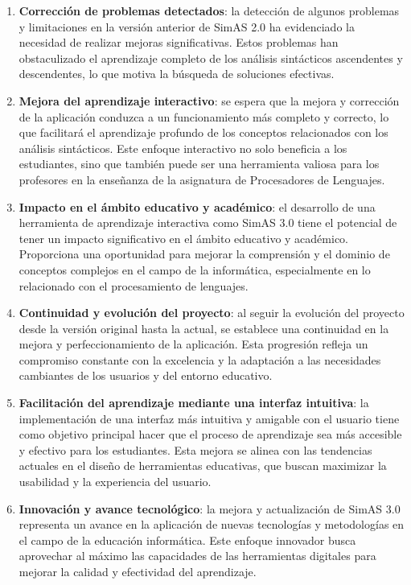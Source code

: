 \begin{enumerate}
    \item \textbf{Corrección de problemas detectados}: la detección de algunos problemas y limitaciones en la versión anterior de SimAS 2.0 ha evidenciado la necesidad de realizar mejoras significativas. Estos problemas han obstaculizado el aprendizaje completo de los análisis sintácticos ascendentes y descendentes, lo que motiva la búsqueda de soluciones efectivas.
    
    \item \textbf{Mejora del aprendizaje interactivo}: se espera que la mejora y corrección de la aplicación conduzca a un funcionamiento más completo y correcto, lo que facilitará el aprendizaje profundo de los conceptos relacionados con los análisis sintácticos. Este enfoque interactivo no solo beneficia a los estudiantes, sino que también puede ser una herramienta valiosa para los profesores en la enseñanza de la asignatura de Procesadores de Lenguajes.
    
    \item \textbf{Impacto en el ámbito educativo y académico}: el desarrollo de una herramienta de aprendizaje interactiva como SimAS 3.0 tiene el potencial de tener un impacto significativo en el ámbito educativo y académico. Proporciona una oportunidad para mejorar la comprensión y el dominio de conceptos complejos en el campo de la informática, especialmente en lo relacionado con el procesamiento de lenguajes.
    
    \item \textbf{Continuidad y evolución del proyecto}: al seguir la evolución del proyecto desde la versión original hasta la actual, se establece una continuidad en la mejora y perfeccionamiento de la aplicación. Esta progresión refleja un compromiso constante con la excelencia y la adaptación a las necesidades cambiantes de los usuarios y del entorno educativo.
    
    \item \textbf{Facilitación del aprendizaje mediante una interfaz intuitiva}: la implementación de una interfaz más intuitiva y amigable con el usuario tiene como objetivo principal hacer que el proceso de aprendizaje sea más accesible y efectivo para los estudiantes. Esta mejora se alinea con las tendencias actuales en el diseño de herramientas educativas, que buscan maximizar la usabilidad y la experiencia del usuario.

    \item \textbf{Innovación y avance tecnológico}: la mejora y actualización de SimAS 3.0 representa un avance en la aplicación de nuevas tecnologías y metodologías en el campo de la educación informática. Este enfoque innovador busca aprovechar al máximo las capacidades de las herramientas digitales para mejorar la calidad y efectividad del aprendizaje.


\end{enumerate}
